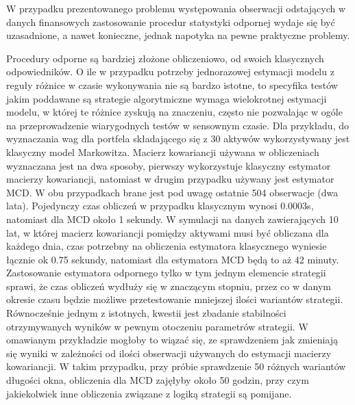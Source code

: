 \documentclass[a4paper,12pt,openany, DIV=calc, headsepline]{scrbook}
\begin{document}
W przypadku prezentowanego problemu występowania obserwacji odstających w danych finansowych zastosowanie procedur statystyki odpornej wydaje się być uzasadnione, a nawet konieczne, jednak napotyka na pewne praktyczne problemy.

Procedury odporne są bardziej złożone obliczeniowo, od swoich klasycznych odpowiedników. O ile w przypadku potrzeby jednorazowej estymacji modelu z reguły różnice w czasie wykonywania nie są bardzo istotne, to specyfika testów jakim poddawane są strategie algorytmiczne wymaga wielokrotnej estymacji modelu, w której te różnice zyskują na znaczeniu, często nie pozwalając w ogóle na przeprowadzenie wiarygodnych testów w sensownym czasie. Dla przykładu, do wyznaczania wag dla portfela składającego się z 30 aktywów wykorzystywany jest klasyczny model Markowitza. Macierz kowariancji używana w obliczeniach wyznaczana jest na dwa sposoby, pierwszy wykorzystuje klasyczny estymator macierzy kowariancji, natomiast w drugim przypadku używany jest estymator MCD. W obu przypadkach brane jest pod uwagę ostatnie 504 obserwacje (dwa lata). Pojedynczy czas obliczeń w przypadku klasycznym wynosi 0.0003s, natomiast dla MCD około 1 sekundy. W symulacji na danych zawierających 10 lat, w której macierz kowariancji pomiędzy aktywami musi być obliczana dla każdego dnia, czas potrzebny na obliczenia estymatora klasycznego wyniesie łącznie ok 0.75 sekundy, natomiast dla estymatora MCD będą to aż 42 minuty. Zastosowanie estymatora odpornego tylko w tym jednym elemencie strategii sprawi, że czas obliczeń wydłuży się w znaczącym stopniu, przez co w danym okresie czasu będzie możliwe przetestowanie mniejszej ilości wariantów strategii. Równocześnie jednym z istotnych, kwestii jest zbadanie stabilności otrzymywanych wyników w pewnym otoczeniu parametrów strategii. W omawianym przykładzie mogłoby to wiązać się, ze sprawdzeniem jak zmieniają się wyniki w zależności od ilości obserwacji używanych do estymacji macierzy kowariancji. W takim przypadku, przy próbie sprawdzenie 50 różnych wariantów długości okna, obliczenia dla MCD zajęłyby około 50 godzin, przy czym jakiekolwiek inne obliczenia związane z logiką strategii są pomijane. 
\end{document}
